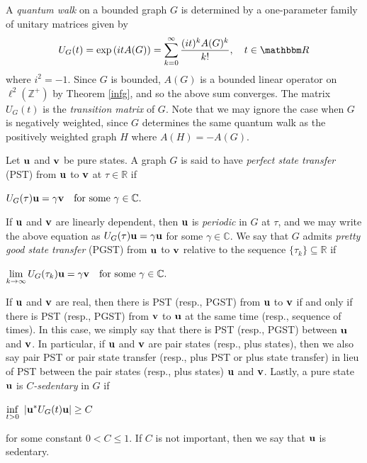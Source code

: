 \documentclass[12pt,a4paper]{article}
\def \Rl {{\mathbbm R}}
\def \u {{\bf u}}
\def \v {{\bf v}}
\newcommand{\mb}[1]{\left|#1\right|}
\begin{document}
A \textit{quantum walk} on a bounded graph $G$ is determined by a one-parameter family of unitary matrices given by 
\begin{equation*}
U_G(t)=\exp{(itA(G))}=\displaystyle\sum_{k=0}^\infty\frac{(it)^kA(G)^k}{k!},\quad t\in\Rl
\end{equation*}
where $i^2=-1.$ Since $G$ is bounded, $A(G)$ is a bounded linear operator on $\ell^2(\mathbb{Z}^+)$ by Theorem \ref{infg}, and so the above sum converges. The matrix $U_G(t)$ is the \textit{transition matrix} of $G$. Note that we may ignore the case when $G$ is negatively weighted, since $G$ determines the same quantum walk as the positively weighted graph $H$ where $A(H)=-A(G)$.


Let $\u$ and $\v$ be pure states. %
A graph $G$ is said to have \textit{perfect state transfer} (PST) from $\u$ to $\v$ at $\tau \in \mathbb{R}$ if
\begin{center}
$U_G(\tau)\u=\gamma\v\quad \text{for some}~\gamma\in\mathbb{C}.$
\end{center}
If $\u$ and $\v$ are linearly dependent, then $\u$ is \textit{periodic} in $G$ at $\tau$, and we may write the above equation as $U_G(\tau)\u=\gamma\u$ for some $\gamma\in\mathbb{C}.$
We say that $G$ admits \textit{pretty good state transfer} (PGST) from $\u$ to $\v$ relative to the sequence $\{\tau_k\} \subseteq \mathbb{R}$ if
\begin{center}
$\displaystyle\lim_{k\rightarrow\infty}U_G(\tau_k)\u=\gamma\v\quad\text{for some}~\gamma\in\mathbb{C}.$
\end{center}
If $\u$ and $\v$ are real, then there is PST (resp., PGST) from $\u$ to $\v$ if and only if there is PST (resp., PGST) from $\v$ to $\u$ at the same time (resp., sequence of times). In this case, we simply say that there is PST (resp., PGST) between $\u$ and $\v$. In particular, if $\u$ and $\v$ are pair states (resp., plus states), then we also say pair PST or pair state transfer (resp., plus PST or plus state transfer) in lieu of PST between the pair states (resp., plus states) $\u$ and $\v$. Lastly, a pure state $\u$ is \textit{$C$-sedentary} in $G$ if
\begin{center}
$\displaystyle\inf_{t>0}~\mb{\u^*U_G(t)\u}\geq C$
\end{center}
for some constant $0 < C \leq 1$. If $C$ is not important, then we say that $\u$ is sedentary.
\end{document}
